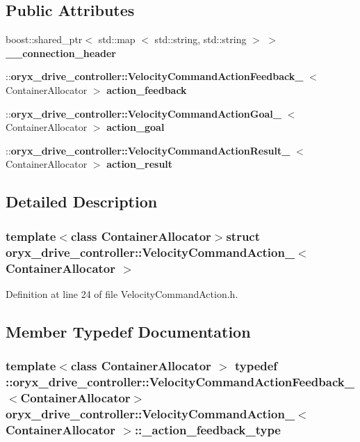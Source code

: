 \subsection*{\-Public \-Attributes}
\begin{DoxyCompactItemize}
\item 
boost\-::shared\-\_\-ptr$<$ std\-::map\*
$<$ std\-::string, std\-::string $>$ $>$ {\bf \-\_\-\-\_\-connection\-\_\-header}
\item 
\-::{\bf oryx\-\_\-drive\-\_\-controller\-::\-Velocity\-Command\-Action\-Feedback\-\_\-}\*
$<$ \-Container\-Allocator $>$ {\bf action\-\_\-feedback}
\item 
\-::{\bf oryx\-\_\-drive\-\_\-controller\-::\-Velocity\-Command\-Action\-Goal\-\_\-}\*
$<$ \-Container\-Allocator $>$ {\bf action\-\_\-goal}
\item 
\-::{\bf oryx\-\_\-drive\-\_\-controller\-::\-Velocity\-Command\-Action\-Result\-\_\-}\*
$<$ \-Container\-Allocator $>$ {\bf action\-\_\-result}
\end{DoxyCompactItemize}


\subsection{\-Detailed \-Description}
\subsubsection*{template$<$class Container\-Allocator$>$struct oryx\-\_\-drive\-\_\-controller\-::\-Velocity\-Command\-Action\-\_\-$<$ Container\-Allocator $>$}



\-Definition at line 24 of file \-Velocity\-Command\-Action.\-h.



\subsection{\-Member \-Typedef \-Documentation}
\subsubsection[{\-\_\-action\-\_\-feedback\-\_\-type}]{\setlength{\rightskip}{0pt plus 5cm}template$<$class Container\-Allocator $>$ typedef \-::{\bf oryx\-\_\-drive\-\_\-controller\-::\-Velocity\-Command\-Action\-Feedback\-\_\-}$<$\-Container\-Allocator$>$ {\bf oryx\-\_\-drive\-\_\-controller\-::\-Velocity\-Command\-Action\-\_\-}$<$ \-Container\-Allocator $>$\-::{\bf \-\_\-action\-\_\-feedback\-\_\-type}}\label{structoryx__drive__controller_1_1VelocityCommandAction___ac0adbab735ff446840b05c75929ab527}


